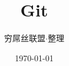 \documentclass[a4paper,11pt]{book}
\title{Git}
\author{穷屌丝联盟$\cdot$整理}
\date{\today}
\begin{document}
\maketitle
\tableofcontents
\listoffigures
\listoftables
\printindex

\renewcommand{\chaptermark}[1]{\markboth{#1}{}}






\end{document}
